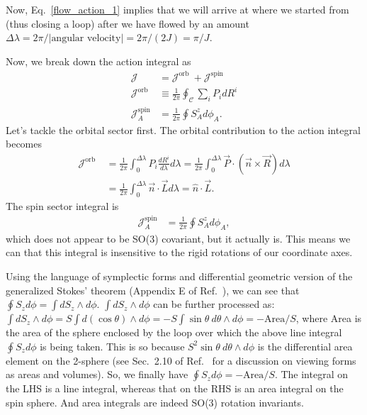Now, Eq.~\eqref{flow_action_1} implies that we will
arrive at where we started from (thus closing  a loop) after we have
flowed by an amount $\Delta \lambda = 
2 \pi/|\text{angular~velocity}|  
= 2 \pi/(2 J)   = \pi/J$.


Now, we break down the action integral as
\begin{equation}
\begin{aligned}
\mathcal{J} &=\mathcal{J}^{\text {orb }}+\mathcal{J}^{\text {spin }} \\
\mathcal{J}^{\text {orb }} & \equiv \frac{1}{2 \pi} \oint_{\mathcal{C}} \sum_{i} P_{i} d R^{i}   \\
\mathcal{J}_{A}^{\mathrm{spin}}  & =\frac{1}{2 \pi} \oint S_{A}^{z} d \phi_{A} .
\end{aligned}
\end{equation}
Let's tackle the orbital sector first. The orbital contribution
to the action integral becomes
\begin{align}
\mathcal{J}^{\text {orb }} &=\frac{1}{2 \pi} \int_{0}^{\Delta \lambda} P_{i} \frac{d R^{i}}{d \lambda} d \lambda=\frac{1}{2 \pi} \int_{0}^{\Delta \lambda} \vec{P} \cdot(\vec{n} \times \vec{R}) d \lambda \\
&=\frac{1}{2 \pi} \int_{0}^{\Delta \lambda} \vec{n} \cdot \vec{L} d \lambda=\hat{n} \cdot \vec{L}   .     \label{orbital_contribution}
\end{align}
The spin sector integral is 
\begin{align}
\mathcal{J}_{A}^{\mathrm{spin}}  & =\frac{1}{2 \pi} \oint S_{A}^{z} d \phi_{A},
\end{align}
which does not appear to be SO(3) covariant, but it actually is. 
This means we can that this integral is insensitive to
the rigid rotations of our coordinate axes.


\hfill \break


\begin{definition}[label=def:D]
Using the language of symplectic forms and differential geometric version 
of the generalized Stokes' theorem
(Appendix E of Ref.~\cite{carroll2004spacetime}), we can see that 
$ \oint S_z d \phi =  \int d S_z \wedge d\phi$. 
$\int d S_z \wedge d\phi$ can be further processed as: 
$   \int d S_z \wedge d\phi = S \int d (\cos \theta) \wedge d\phi 
= - S \int \sin \theta ~ d \theta \wedge d\phi = - \text{Area}/S  $,
where Area is the area of the sphere
 enclosed by the loop over which the above
line integral $\oint S_z d \phi $ is being taken.
This is so because
$S^2 \sin \theta ~ d \theta \wedge d\phi$ is the differential area element
on the 2-sphere (see Sec.~2.10 of Ref.~\cite{carroll2004spacetime}
for a discussion on viewing forms as areas and volumes).
So, we finally have 
$ \oint S_z d \phi =  - \text{Area}/S$.
The integral on the LHS is a
line integral, whereas that on the RHS is an area integral on the spin
sphere. And area integrals are indeed SO(3) rotation invariants.
\end{definition}

